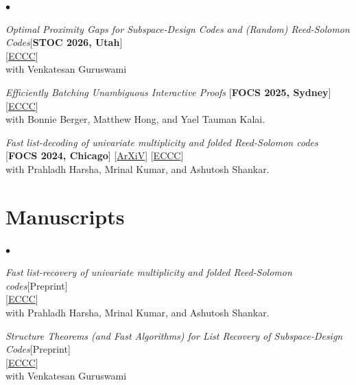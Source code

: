 \documentclass[margin,line, 10pt]{res}
\newenvironment{list2}{
  \begin{list}{$\bullet$}{%
      \setlength{\itemsep}{0in}
      \setlength{\parsep}{0in} \setlength{\parskip}{0in}
      \setlength{\topsep}{0in} \setlength{\partopsep}{0in} 
      \setlength{\leftmargin}{0.2in}}}{\end{list}}
\begin{document}
\begin{resume}
\begin{list2}
    \item \textit{Optimal Proximity Gaps for Subspace-Design Codes and (Random) Reed-Solomon Codes}{\hfill [\textbf{STOC 2026, Utah}]}\\
    {[\href{https://eccc.weizmann.ac.il/report/2025/166/}{ECCC}]}\\
    with Venkatesan Guruswami
    \item \textit{Efficiently Batching Unambiguous Interactive Proofs} {\hfill [\textbf{FOCS 2025, Sydney}]}\\
    {[\href{https://eccc.weizmann.ac.il/report/2025/159/}{ECCC}]}\\
    with Bonnie Berger, Matthew Hong, and Yael Tauman Kalai. 
    \item \textit{Fast list-decoding of univariate multiplicity and folded Reed-Solomon codes} {\hfill[\textbf{FOCS 2024, Chicago}]}
    [\href{https://arxiv.org/abs/2311.17841}{ArXiV}]
    [\href{https://eccc.weizmann.ac.il/report/2023/185/}{ECCC}]\\
     with Prahladh Harsha, Mrinal Kumar, and Ashutosh Shankar.
\end{list2}

\section{\sc Manuscripts}

\begin{list2}
    

    \item \textit{Fast list-recovery of univariate multiplicity and folded Reed-Solomon codes}{\hfill [Preprint]}\\
    {[\href{https://eccc.weizmann.ac.il/report/2025/194/}{ECCC}]}\\
    with Prahladh Harsha, Mrinal Kumar, and Ashutosh Shankar.

    \item \textit{Structure Theorems (and Fast Algorithms) for List Recovery of Subspace-Design Codes}{\hfill [Preprint]}\\
    {[\href{https://eccc.weizmann.ac.il/report/2025/212/}{ECCC}]}\\
    with Venkatesan Guruswami
\end{list2}













\end{resume}
\end{document}
